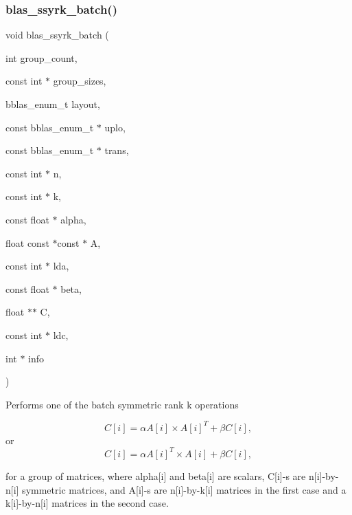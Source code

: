 \subsubsection{\texorpdfstring{blas\+\_\+ssyrk\+\_\+batch()}{blas\_ssyrk\_batch()}}
{\footnotesize\ttfamily void blas\+\_\+ssyrk\+\_\+batch (\begin{DoxyParamCaption}\item[{int}]{group\+\_\+count,  }\item[{const int $\ast$}]{group\+\_\+sizes,  }\item[{bblas\+\_\+enum\+\_\+t}]{layout,  }\item[{const bblas\+\_\+enum\+\_\+t $\ast$}]{uplo,  }\item[{const bblas\+\_\+enum\+\_\+t $\ast$}]{trans,  }\item[{const int $\ast$}]{n,  }\item[{const int $\ast$}]{k,  }\item[{const float $\ast$}]{alpha,  }\item[{float const $\ast$const $\ast$}]{A,  }\item[{const int $\ast$}]{lda,  }\item[{const float $\ast$}]{beta,  }\item[{float $\ast$$\ast$}]{C,  }\item[{const int $\ast$}]{ldc,  }\item[{int $\ast$}]{info }\end{DoxyParamCaption})}

Performs one of the batch symmetric rank k operations

\[ C[i] = \alpha A[i] \times A[i]^T + \beta C[i], \] or \[ C[i] = \alpha A[i]^T \times A[i] + \beta C[i], \]

for a group of matrices, where alpha\mbox{[}i\mbox{]} and beta\mbox{[}i\mbox{]} are scalars, C\mbox{[}i\mbox{]}-\/s are n\mbox{[}i\mbox{]}-\/by-\/n\mbox{[}i\mbox{]} symmetric matrices, and A\mbox{[}i\mbox{]}-\/s are n\mbox{[}i\mbox{]}-\/by-\/k\mbox{[}i\mbox{]} matrices in the first case and a k\mbox{[}i\mbox{]}-\/by-\/n\mbox{[}i\mbox{]} matrices in the second case.


